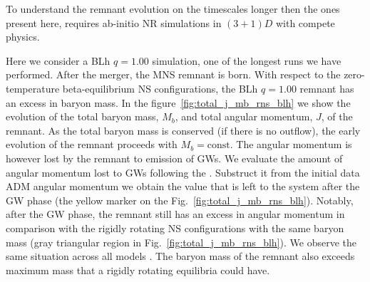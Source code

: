 To understand the remnant evolution on the timescales longer then the ones 
present here, requires ab-initio \ac{NR} simulations in $(3+1)D$ with compete physics.

Here we consider a BLh $q=1.00$ simulation, one of the longest runs we have performed.
After the merger, the \ac{MNS} remnant is born. With respect to the zero-temperature 
beta-equilibrium \ac{NS} configurations, the BLh $q=1.00$ 
remnant has an excess in baryon mass.
In the figure~\ref{fig:total_j_mb_rns_blh} we show the evolution of the 
total baryon mass, $M_b$, and total angular momentum, $J$, of the remnant.
As the total baryon mass is conserved (if there is no outflow), the early evolution 
of the remnant proceeds with $M_b=\text{const}$. The angular momentum is however 
lost by the remnant to emission of \acp{GW}. 
We evaluate the amount of angular momentum lost to \acp{GW} following the 
\citet{Damour:2011fu,Bernuzzi:2012ci,Bernuzzi:2015rla}.
Substruct it from the initial data \ac{ADM} angular momentum we obtain the value 
that is left to the system after the \ac{GW} phase 
(the yellow marker on the Fig.~\ref{fig:total_j_mb_rns_blh}).
Notably, after the \ac{GW} phase, the remnant still has an excess in angular momentum
in comparison with the rigidly rotating \ac{NS} configurations with the same baryon mass 
(gray triangular region in Fig.~\ref{fig:total_j_mb_rns_blh}).
We observe the same situation across all models \citep{Zappa:2017xba,Radice:2018xqa}.
The baryon mass of the remnant also exceeds maximum mass that a rigidly rotating 
equilibria could have.
